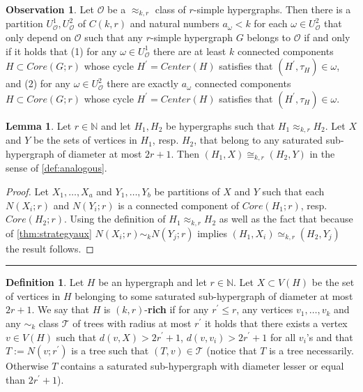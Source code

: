 \documentclass[12pt,notitlepage,a4paper]{article}
\theoremstyle{definition}
\newtheorem{obs}{Observation}[section]
\newtheorem{lemma}{Lemma}[section]
\newtheorem{definition}{Definition}[section]
\newcommand{\N}{\mathbb{N}}
\newcommand{\sep}{\noindent\rule{2cm}{0.4pt}}
\begin{document}
\begin{obs}\label{obs:agreeablecores}
	Let $\mathcal{O}$ be a $\approx_{k,r}$ class
	of $r$-simple hypergraphs. 
	Then there is a partition $U^1_\mathcal{O},
	U^2_\mathcal{O}$ of $C(k,r)$ and natural numbers $a_\omega<k$
	for each $\omega\in U^2_\mathcal{O}$ that only depend on 
	$\mathcal{O}$ such that any $r$-simple hypergraph $G$ belongs to
	$\mathcal{O}$ if and only if it holds that (1) for any $\omega\in U^1_\mathcal{O}$ 
	there are at least $k$ connected components $H \subset Core(G;r)$ whose cycle 		
	$H^\prime=Center(H)$ satisfies that	$(H^{\prime},\tau_{H})\in \omega$, and
	(2) for any $\omega\in U^2_\mathcal{O}$ there are exactly $a_\omega$ 
	connected components $H \subset Core(G;r)$ whose cycle 
	$H^\prime=Center(H)$ satisfies that	$(H^{\prime},\tau_{H})\in \omega$.	
\end{obs}


\begin{lemma} \label{lem:aux1}
	Let $r\in \N$ and let $H_1, H_2$ be hypergraphs such that 
	$H_1\approx_{k,r} H_2$. Let $X$ and $Y$ be the
	sets of vertices in $H_1$, resp. $H_2$, that
	belong to any saturated sub-hypergraph of diameter 
	at most $2r+1$. Then $(H_1,X)\cong_{k,r} (H_2,Y)$ in the sense of
	\cref{def:analogous}.
\end{lemma}
\begin{proof}
	Let $X_1,\dots, X_a$ and $Y_1,\dots, Y_b$ be partitions of
	$X$ and $Y$ such that each $N(X_i;r)$ and $N(Y_i;r)$ is 
	a connected component of $Core(H_1;r)$, resp. $Core(H_2;r)$.
	Using the definition of $H_1\approx_{k,r}H_2$ as well 
	as the fact that  because of \cref{thm:strategyaux}
	$N(X_i;r)\sim_k N(Y_j;r)$ implies 
	$(H_1,X_i)\simeq_{k,r} (H_2,Y_j)$
	the result follows.	
\end{proof}
\sep
\begin{definition} \label{def:rich}
	Let $H$ be an hypergraph and let $r\in\N$. Let
	$X\subset V(H)$ be the set of vertices in $H$
	belonging to some saturated sub-hypergraph of diameter
	at most $2r+1$.	We say that $H$ is $(k,r)$-\textbf{rich}
	if for any $r^\prime\leq r$, any vertices $v_1,\dots, v_k$ 
	and any $\sim_k$ class $\mathcal{T}$ of trees with radius
	at most $r^\prime$ it holds that there exists a vertex $v\in V(H)$
	such that $d(v,X)> 2r^\prime+1$, $d(v,v_i)>2r^\prime+1$ for all
	$v_i$'s and that $T:=N(v;r^\prime)$ is a tree such that
	$(T,v)\in \mathcal{T}$ (notice that $T$ is a tree necessarily. 
	Otherwise $T$ contains a saturated sub-hypergraph with diameter 
	lesser or equal than $2r^\prime+1$).	
\end{definition}
\end{document}
